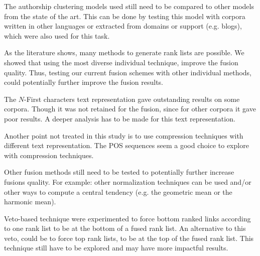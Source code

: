 The authorship clustering models used still need to be compared to other models from the state of the art.
This can be done by testing this model with corpora written in other languages or extracted from domains or support (e.g. blogs), which were also used for this task.

As the literature shows, many methods to generate rank lists are possible.
We showed that using the most diverse individual technique, improve the fusion quality.
Thus, testing our current fusion schemes with other individual methods, could potentially further improve the fusion results.

The $N$-First characters text representation gave outstanding results on some corpora.
Though it was not retained for the fusion, since for other corpora it gave poor results.
A deeper analysis has to be made for this text representation.

Another point not treated in this study is to use compression techniques with different text representation.
The POS sequences seem a good choice to explore with compression techniques.

Other fusion methods still need to be tested to potentially further increase fusions quality.
For example: other normalization techniques can be used and/or other ways to compute a central tendency (e.g. the geometric mean or the harmonic mean).

Veto-based technique were experimented to force bottom ranked links according to one rank list to be at the bottom of a fused rank list.
An alternative to this veto, could be to force top rank lists, to be at the top of the fused rank list.
This technique still have to be explored and may have more impactful results.
